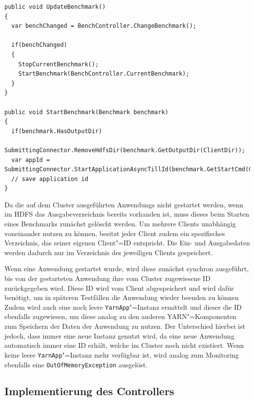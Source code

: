 \begin{lstlisting}[label=lst:startClientBenchmark,style=cs,
caption={[Auswahl und Start des nachfolgenden Benchmarks]
    Auswahl und Start des nachfolgenden Benchmarks (gekürzt).
    Die Methode \texttt{ChangeBenchmark()} des Benchmark"=Controllers wird in \cref{subsec:selectionNextBenchmark} erläutert.}]
public void UpdateBenchmark()
{
  var benchChanged = BenchController.ChangeBenchmark();
  
  if(benchChanged)
  {
    StopCurrentBenchmark();
    StartBenchmark(BenchController.CurrentBenchmark);
  }
}

public void StartBenchmark(Benchmark benchmark)
{
  if(benchmark.HasOutputDir)
    SubmittingConnector.RemoveHdfsDir(benchmark.GetOutputDir(ClientDir));
  var appId = SubmittingConnector.StartApplicationAsyncTillId(benchmark.GetStartCmd(ClientDir));
  // save application id
}
\end{lstlisting}

Da die auf dem Cluster ausgeführten \glspl{Anwendung} \uU nicht gestartet werden, wenn im \gls{HDFS} das Ausgabeverzeichnis bereits vorhanden ist, muss dieses beim Starten eines Benchmarks zunächst gelöscht werden.
Um mehrere Clients unabhängig voneinander nutzen zu können, besitzt jeder Client zudem ein spezifisches Verzeichnis, das seiner eigenen Client"=ID entspricht.
Die Ein- und Ausgabedaten werden dadurch nur im Verzeichnis des jeweiligen Clients gespeichert.

Wenn eine \gls{Anwendung} gestartet wurde, wird diese zunächst synchron ausgeführt, bis von der gestarteten \gls{Anwendung} ihre vom Cluster zugewiesene ID zurückgegeben wird.
Diese ID wird vom Client abgespeichert und wird dafür benötigt, um in späteren Testfällen die \gls{Anwendung} wieder beenden zu können
Zudem wird auch eine noch leere \texttt{YarnApp}"=Instanz ermittelt und dieser die ID ebenfalls zugewiesen, um diese analog zu den anderen \gls{YARN}"=Komponenten zum Speichern der Daten der \gls{Anwendung} zu nutzen.
Der Unterschied hierbei ist jedoch, dass immer eine neue Instanz genutzt wird, da eine neue \gls{Anwendung} automatisch immer eine ID erhält, welche im Cluster noch nicht existiert.
Wenn keine leere \texttt{YarnApp}"=Instanz mehr verfügbar ist, wird analog zum Monitoring ebenfalls eine \texttt{OutOfMemoryException} ausgelöst.

\subsection{Implementierung des Controllers}
\label{subsec:yarnController}


